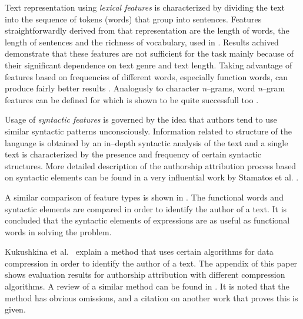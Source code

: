 \documentclass{llncs}
\begin{document}
Text representation using \emph{lexical features} is characterized by dividing
the text into the sequence of tokens (words) that group into sentences. Features
straightforwardly derived from that representation are the length of words, the
length of sentences and the richness of vocabulary, used in
\cite{mendenhall1887,holmes1994authorship} . Results achived demonstrate that
these features are not sufficient for the task mainly because of their
significant dependence on text genre and text length. Taking advantage of
features based on frequencies of different words, especially function words,
can produce fairly better results
\cite{argamon2005measuring,uzuner2005comparative,koppel2003exploiting,zhao2005effective}.
Analogusly to character \emph{n}--grams, word \emph{n}--gram features
can be defined for which is shown to be quite successfull too
\cite{keselj2003n,coyotl2006authorship}.

Usage of \emph{syntactic features} is governed by the idea that authors tend to
use similar syntactic patterns unconsciously. Information related to structure of
the language is obtained by an in--depth syntactic analysis of the text and a
single text is characterized by the presence and frequency of certain syntactic
structures. More detailed description of the authorship attribution process based
on syntactic elements can be found in a very influential work by Stamatos et al.
\cite{stamatatos2001computer}.
 \cite{luyckx2005shallow,uzuner2005comparative,}

A similar comparison of feature types is shown in
\cite{uzuner2005comparative}. The functional words and syntactic
elements are compared in order to identify the author of a text. It is
concluded that the syntactic elements of expressions are as useful as functional 
words in solving the problem.

Kukushkina et al.\ \cite{kukushkina2001using} explain a method that uses certain
algorithms for data compression in order to identify the author of a text. The
appendix of this paper shows evaluation results for authorship attribution with
different compression algorithms.
A review of a similar method can be found in 
\cite{zhao2005effective}. It is noted that the method has obvious omissions, 
and a citation on another work that proves this is given.
\end{document}
